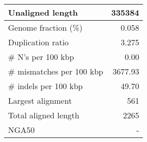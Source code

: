 \documentclass[12pt,a4paper]{article}
\begin{document}
\begin{table}[ht]
\begin{center}
\begin{tabular}{|l*{1}{|r}|}
Unaligned length & 335384 \\ \hline
Genome fraction (\%) & 0.058 \\ \hline
Duplication ratio & 3.275 \\ \hline
\# N's per 100 kbp & 0.00 \\ \hline
\# mismatches per 100 kbp & 3677.93 \\ \hline
\# indels per 100 kbp & 49.70 \\ \hline
Largest alignment & 561 \\ \hline
Total aligned length & 2265 \\ \hline
NGA50 & - \\ \hline
\end{tabular}
\end{center}
\end{table}
\end{document}
